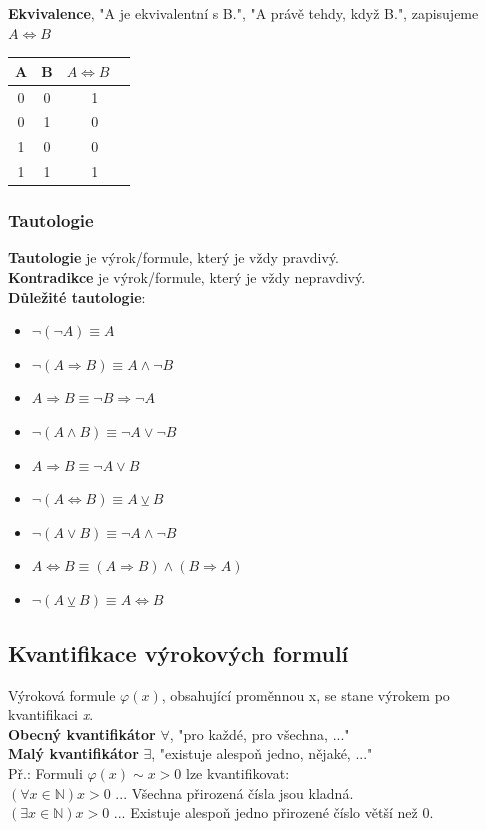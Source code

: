 \documentclass[12pt, a4paper]{article}
\begin{document}
\textbf{Ekvivalence}, "A je ekvivalentní s B.", "A právě tehdy, když B.", zapisujeme $A \Leftrightarrow B$ 
\begin{center}
\begin{tabular}{|c | c | c|} 
\hline
A & B & $A \Leftrightarrow B$ \ \\
\hline
0 & 0 & 1 \\
\hline
0 & 1 & 0 \\
\hline
1 & 0 & 0 \\
\hline
1 & 1 & 1\\
\hline
\end{tabular}
\end{center}

\subsubsection*{Tautologie}
\textbf{Tautologie} je výrok/formule, který je vždy pravdivý.\\ 
\textbf{Kontradikce} je výrok/formule, který je vždy nepravdivý.\\
\textbf{Důležité tautologie}:
\begin{itemize}
\item $\neg(\neg A) \equiv A$ 
\item $\neg (A \Rightarrow B) \equiv A \land \neg B$ 
\item $ A \Rightarrow B \equiv \neg B \Rightarrow \neg A $
\item $ \neg (A \land B) \equiv \neg A \lor \neg B$
\item $ A \Rightarrow B \equiv \neg A \lor B $
\item $ \neg (A \Leftrightarrow B) \equiv A \veebar B $
\item $ \neg (A \lor B) \equiv \neg A \land \neg B $
\item $ A \Leftrightarrow B \equiv (A \Rightarrow B) \land (B \Rightarrow A) $
\item $ \neg (A \veebar B) \equiv A \Leftrightarrow B$
\end{itemize}
\pagebreak

\subsection*{Kvantifikace výrokových formulí}
Výroková formule $\varphi (x)$, obsahující proměnnou x, se stane výrokem po kvantifikaci \textit{x}.\\
\textbf{Obecný kvantifikátor} $\forall$, "pro každé, pro všechna, ..." \\
\textbf{Malý kvantifikátor} $\exists$, "existuje alespoň jedno, nějaké, ..." \\
Př.: Formuli $\varphi (x) \sim x > 0$ lze kvantifikovat:\\
$(\forall x \in \mathbb{N}) x > 0$ ... Všechna přirozená čísla jsou kladná.\\
$ (\exists x \in \mathbb{N}) x > 0$ ... Existuje alespoň jedno přirozené číslo větší než 0.\\
\end{document}
